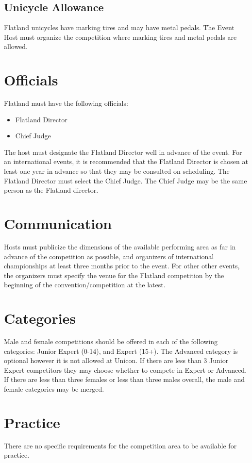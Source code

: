 \subsection{Unicycle Allowance}
Flatland unicycles have marking tires and may have metal pedals.
The Event Host must organize the competition where marking tires and metal pedals are allowed.

\section{Officials}

Flatland must have the following officials:
\begin{itemize}
\item Flatland Director
\item Chief Judge
\end{itemize}

The host must designate the Flatland Director well in advance of the event.
For an international events, it is recommended that the Flatland Director is chosen at least one year in advance so that they may be consulted on scheduling.
The Flatland Director must select the Chief Judge.
The Chief Judge may be the same person as the Flatland director. 

\section{Communication}

Hosts must publicize the dimensions of the available performing area as far in advance of the competition as possible, and organizers of international championships at least three months prior to the event.
For other other events, the organizers must specify the venue for the Flatland competition by the beginning of the convention/competition at the latest.

\section{Categories}
Male and female competitions should be offered in each of the following categories: Junior Expert (0-14), and Expert (15+).
The Advanced category is optional however it is not allowed at Unicon.
If there are less than 3 Junior Expert competitors they may choose whether to compete in Expert or Advanced.
If there are less than three females or less than three males overall, the male and female categories may be merged.

\section{Practice}

There are no specific requirements for the competition area to be available for practice.
